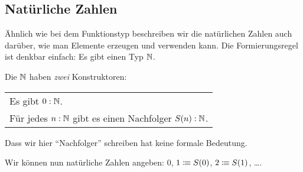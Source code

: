\subsection{Natürliche Zahlen}
Ähnlich wie bei dem Funktionstyp beschreiben wir die natürlichen Zahlen auch darüber, wie man Elemente erzeugen und verwenden kann.
Die Formierungsregel ist denkbar einfach: Es gibt einen Typ $\N$\index{$\N$}.

Die  $\N$ haben \emph{zwei} Konstruktoren:
\begin{center}
\begin{tabular}{l}
  Es gibt $0:\mathbb{N}$. \\
  Für jedes $n:\mathbb{N}$ gibt es einen Nachfolger $S(n):\mathbb{N}$.
\end{tabular}
\end{center}
Dass wir hier ``Nachfolger'' schreiben hat keine formale Bedeutung.
\begin{beispiel}
Wir können nun natürliche Zahlen angeben: $0$, $1\vcentcolon\mspace{-1.2mu}\equiv S(0)$, $2\vcentcolon\mspace{-1.2mu}\equiv S(1)$, \dots.
\end{beispiel}
